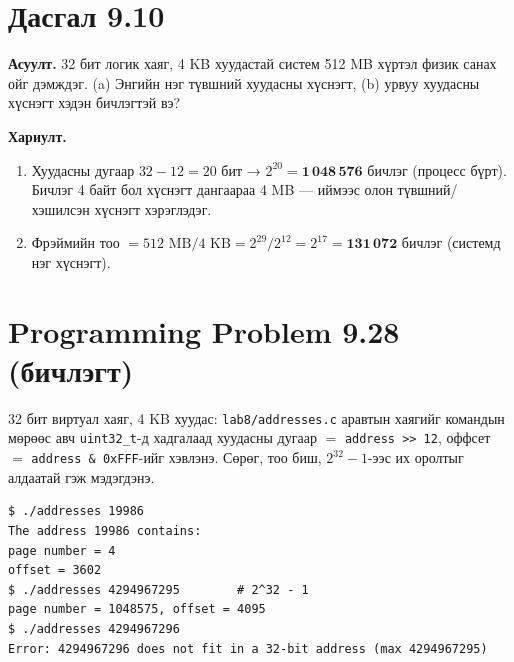\documentclass[12pt,a4paper]{article}
\newcommand{\question}[2]{\section{Дасгал #1}\textbf{Асуулт.} #2\par\medskip\textbf{Хариулт.}\par}
\begin{document}
\question{9.10}{32 бит логик хаяг, 4 KB хуудастай систем 512 MB хүртэл физик санах ойг дэмждэг. (a) Энгийн нэг түвшний хуудасны хүснэгт, (b) урвуу хуудасны хүснэгт хэдэн бичлэгтэй вэ?}

\begin{enumerate}[label=(\alph*), leftmargin=1.5em]
  \item Хуудасны дугаар $32 - 12 = 20$ бит → $2^{20} = \mathbf{1\,048\,576}$ бичлэг (процесс бүрт). Бичлэг 4 байт бол хүснэгт дангаараа 4 MB — иймээс олон түвшний/хэшилсэн хүснэгт хэрэглэдэг.
  \item Фрэймийн тоо $= 512\text{ MB} / 4\text{ KB} = 2^{29} / 2^{12} = 2^{17} = \mathbf{131\,072}$ бичлэг (системд нэг хүснэгт).
\end{enumerate}

\section{Programming Problem 9.28 (бичлэгт)}

32 бит виртуал хаяг, 4 KB хуудас: \texttt{lab8/addresses.c} аравтын хаягийг командын мөрөөс авч \texttt{uint32\_t}-д хадгалаад хуудасны дугаар $=$ \texttt{address >> 12}, оффсет $=$ \texttt{address \& 0xFFF}-ийг хэвлэнэ. Сөрөг, тоо биш, $2^{32}-1$-ээс их оролтыг алдаатай гэж мэдэгдэнэ.
\begin{lstlisting}[language={}]
$ ./addresses 19986
The address 19986 contains:
page number = 4
offset = 3602
$ ./addresses 4294967295        # 2^32 - 1
page number = 1048575, offset = 4095
$ ./addresses 4294967296
Error: 4294967296 does not fit in a 32-bit address (max 4294967295)
\end{lstlisting}
\end{document}
